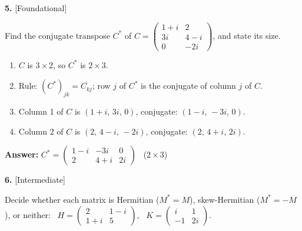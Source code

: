 \documentclass[11pt]{article}
\begin{document}
\par\vspace{2pt}
\begin{minipage}{\linewidth}\textbf{5.} \hfill{\scriptsize\color{ink}[Foundational]}\par\nopagebreak Find the conjugate transpose $C^{*}$ of $C=\begin{pmatrix}1+i&2\\3i&4-i\\0&-2i\end{pmatrix}$, and state its size.
\end{minipage}\par\nopagebreak
\begin{tcolorbox}[breakable,colback=ans,colframe=ansb,boxrule=0.5pt,left=4pt,right=4pt,top=2pt,bottom=2pt]\begin{enumerate}[leftmargin=2.2em,itemsep=1pt,topsep=1pt,label=\textbf{Step \arabic*.}]\item $C$ is $3\times2$, so $C^{*}$ is $2\times3$.
\item Rule: $(C^{*})_{jk}=\overline{C_{kj}}$; row $j$ of $C^{*}$ is the conjugate of column $j$ of $C$.
\item Column 1 of $C$ is $(1+i,\,3i,\,0)$, conjugate: $(1-i,\,-3i,\,0)$.
\item Column 2 of $C$ is $(2,\,4-i,\,-2i)$, conjugate: $(2,\,4+i,\,2i)$.
\end{enumerate}\textbf{Answer:} $C^{*}=\begin{pmatrix}1-i&-3i&0\\2&4+i&2i\end{pmatrix}$ \ ($2\times3$)\end{tcolorbox}
\par\vspace{2pt}
\begin{minipage}{\linewidth}\textbf{6.} \hfill{\scriptsize\color{ink}[Intermediate]}\par\nopagebreak Decide whether each matrix is Hermitian ($M^{*}=M$), skew-Hermitian ($M^{*}=-M$), or neither: \ $H=\begin{pmatrix}2&1-i\\1+i&5\end{pmatrix}$, \ $K=\begin{pmatrix}i&1\\-1&2i\end{pmatrix}$.
\end{minipage}\par\nopagebreak
\end{document}
